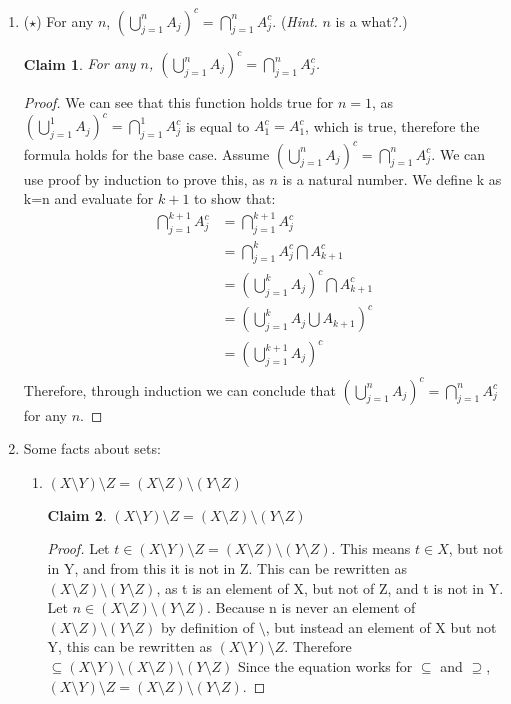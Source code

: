 \documentclass[11pt]{letter}
\newtheorem{claim}{Claim}
\theoremstyle{definition}
\begin{document}
\begin{description}
\begin{enumerate}
\begin{proof}
Let $p\in C$. So $p\in A$, according to $C\subseteq A$. So $p\in B$ according to $A\subseteq B$. So $B\subseteq C$, and $C\subseteq B$ according to definition, therefore $C=B$.
\end{proof}
			\item ($\star$) For any $n$, $\displaystyle\left(\bigcup_{j=1}^n A_j\right)^c=\bigcap_{j=1}^n A_j^c$.  ({\em Hint.} $n$ is a what?.)
\begin{claim}
For any $n$, $\displaystyle\left(\bigcup_{j=1}^n A_j\right)^c=\bigcap_{j=1}^n A_j^c$.  
\end{claim}
\begin{proof}
We can see that this function holds true for $n=1$, as $\displaystyle\left(\bigcup_{j=1}^1 A_j\right)^c=\bigcap_{j=1}^1 A_j^c$ is equal to $A_1^c=A_1^c$, which is true, therefore the formula holds for the base case. Assume $\displaystyle\left(\bigcup_{j=1}^n A_j\right)^c=\bigcap_{j=1}^n A_j^c$. We can use proof by induction to prove this, as $n$ is a natural number.  We define k as k=n and evaluate for $k+1$ to show that:
\begin{align*}
\bigcap_{j=1}^{k+1} A_j^c&=\bigcap_{j=1}^{k+1} A_j^c \\
&=\bigcap_{j=1}^{k} A_j^c\bigcap A_{k+1}^c \\
&=\displaystyle\left(\bigcup_{j=1}^k A_j\right)^c\bigcap A_{k+1}^c \tag{Use inductive hypothesis} \\
&= \displaystyle \left(\bigcup_{j=1}^{k} A_j \bigcup A_{k+1}\right)^c \tag{Used de Morgan's Law}\\
&=\displaystyle\left(\bigcup_{j=1}^{k+1} A_j\right)^c \\
\end{align*}
Therefore, through induction we can conclude that $\displaystyle\left(\bigcup_{j=1}^n A_j\right)^c=\bigcap_{j=1}^n A_j^c$ for any $n$. 
\end{proof}
			\item Some facts about sets:
				\begin{enumerate}
					\item  $(X\setminus Y)\setminus Z=(X\setminus Z)\setminus(Y\setminus Z)$
\begin{claim}
$(X\setminus Y)\setminus Z=(X\setminus Z)\setminus(Y\setminus Z)$
\end{claim}
\begin{proof}
Let $t \in (X\setminus Y)\setminus Z=(X\setminus Z)\setminus(Y\setminus Z)$. This means $t \in X$, but not in Y, and from this it is not in Z. This can be rewritten as $(X\setminus Z)\setminus(Y\setminus Z)$, as t is an element of X, but not of Z, and t is not in Y. \\
Let $n \in  (X\setminus Z)\setminus(Y\setminus Z)$. Because n is never an element of $(X\setminus Z)\setminus(Y\setminus Z)$ by definition of $\setminus$, but instead an element of X but not Y, this can be rewritten as $(X\setminus Y)\setminus Z$. Therefore $\subseteq (X\setminus Y)\setminus  (X\setminus Z)\setminus(Y\setminus Z)$
 Since the equation works for $\subseteq$ and $\supseteq$, $(X\setminus Y)\setminus Z=(X\setminus Z)\setminus(Y\setminus Z)$.


\end{proof}
\end{enumerate}
\end{enumerate}
\end{description}
\end{document}

